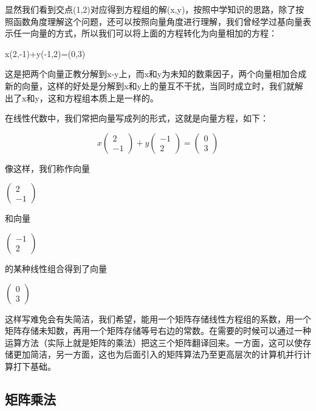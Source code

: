 \documentclass[12.8pt,a4paper,numbering = AMSalpha]{book}
\begin{document}
显然我们看到交点(1,2)对应得到方程组的解(x,y)，按照中学知识的思路，除了按照函数角度理解这个问题，还可以按照向量角度进行理解，我们曾经学过基向量表示任一向量的方式，所以我们可以将上面的方程转化为向量相加的方程：

\begin{center}
	x(2,-1)+y(-1,2)=(0,3)
\end{center}

这是把两个向量正教分解到x-y上，而x和y为未知的数乘因子，两个向量相加合成新的向量，这样的好处是分解到x和y上的量互不干扰，当同时成立时，我们就解出了x和y，这和方程组本质上是一样的。

在线性代数中，我们常把向量写成列的形式，这就是向量方程，如下：

\[
x
\begin{pmatrix}
	2\\
	-1
\end{pmatrix}
+y
\begin{pmatrix}
	-1\\
	2
\end{pmatrix}
=
\begin{pmatrix}
	0\\
	3
\end{pmatrix}
\]

像这样，我们称作向量

$\begin{pmatrix}
	2\\
	-1
\end{pmatrix}$

和向量

$\begin{pmatrix}
	-1\\
	2
\end{pmatrix}$

的某种线性组合得到了向量

$\begin{pmatrix}
	0\\
	3
\end{pmatrix}$

\vspace{10pt}

这样写难免会有失简洁，我们希望，能用一个矩阵存储线性方程组的系数，用一个矩阵存储未知数，再用一个矩阵存储等号右边的常数。在需要的时候可以通过一种运算方法（实际上就是矩阵的乘法）把这三个矩阵翻译回来。一方面，这可以使存储更加简洁，另一方面，这也为后面引入的矩阵算法乃至更高层次的计算机并行计算打下基础。

\subsection{矩阵乘法}
\end{document}
